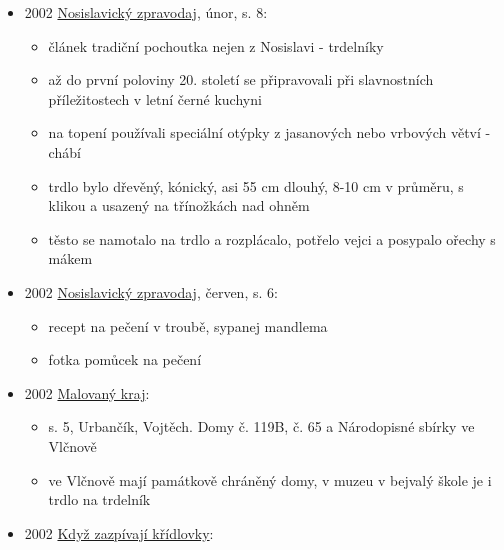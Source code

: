 \begin{itemize}
\begin{itemize}
    \begin{itemize}
    \tightlist
    \item
      v mnoha obcích mezi Uh. Brodem a Hradištěm nesměl o masopustu
      chybět trdelník z nekynutýho taženýho těsta pečenýho na ohni
    \item
      podávaly se rozkrájený na kolečka
    \item
      někde byly součástí svatebního jídelníčku, pohřbech a jinejch
      význačnejch rodinnejch oslavách
    \item
      dneska se pečou jen zcela sporadicky
    \end{itemize}
  \end{itemize}
\item
  2002
  \href{https://www.nosislav.cz/assets/File.ashx?id_org=10486&id_dokumenty=1709}{Nosislavický
  zpravodaj}, únor, s. 8:

  \begin{itemize}
  \tightlist
  \item
    článek tradiční pochoutka nejen z Nosislavi - trdelníky
  \item
    až do první poloviny 20. století se připravovali při slavnostních
    příležitostech v letní černé kuchyni
  \item
    na topení používali speciální otýpky z jasanových nebo vrbových
    větví - chábí
  \item
    trdlo bylo dřevěný, kónický, asi 55 cm dlouhý, 8-10 cm v průměru, s
    klikou a usazený na třínožkách nad ohněm
  \item
    těsto se namotalo na trdlo a rozplácalo, potřelo vejci a posypalo
    ořechy s mákem
  \end{itemize}
\item
  2002
  \href{https://www.nosislav.cz/assets/File.ashx?id_org=10486&id_dokumenty=1709}{Nosislavický
  zpravodaj}, červen, s. 6:

  \begin{itemize}
  \tightlist
  \item
    recept na pečení v troubě, sypanej mandlema
  \item
    fotka pomůcek na pečení
  \end{itemize}
\item
  2002
  \href{https://ceskadigitalniknihovna.cz/uuid/uuid:0e216ec0-0395-11e4-a680-5ef3fc9bb22f}{Malovaný
  kraj}:

  \begin{itemize}
  \tightlist
  \item
    s. 5, Urbančík, Vojtěch. Domy č. 119B, č. 65 a Národopisné sbírky ve
    Vlčnově
  \item
    ve Vlčnově mají památkově chráněný domy, v muzeu v bejvalý škole je
    i trdlo na trdelník
  \end{itemize}
\item
  2002
  \href{https://ceskadigitalniknihovna.cz/uuid/uuid:cd4bfec0-29e6-11ed-af34-5ef3fc9bb22f}{Když
  zazpívají křídlovky}:


\end{itemize}
